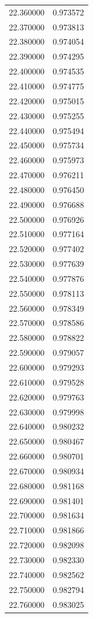 \begin{tabular}{rr}
22.360000 & 0.973572 \\
22.370000 & 0.973813 \\
22.380000 & 0.974054 \\
22.390000 & 0.974295 \\
22.400000 & 0.974535 \\
22.410000 & 0.974775 \\
22.420000 & 0.975015 \\
22.430000 & 0.975255 \\
22.440000 & 0.975494 \\
22.450000 & 0.975734 \\
22.460000 & 0.975973 \\
22.470000 & 0.976211 \\
22.480000 & 0.976450 \\
22.490000 & 0.976688 \\
22.500000 & 0.976926 \\
22.510000 & 0.977164 \\
22.520000 & 0.977402 \\
22.530000 & 0.977639 \\
22.540000 & 0.977876 \\
22.550000 & 0.978113 \\
22.560000 & 0.978349 \\
22.570000 & 0.978586 \\
22.580000 & 0.978822 \\
22.590000 & 0.979057 \\
22.600000 & 0.979293 \\
22.610000 & 0.979528 \\
22.620000 & 0.979763 \\
22.630000 & 0.979998 \\
22.640000 & 0.980232 \\
22.650000 & 0.980467 \\
22.660000 & 0.980701 \\
22.670000 & 0.980934 \\
22.680000 & 0.981168 \\
22.690000 & 0.981401 \\
22.700000 & 0.981634 \\
22.710000 & 0.981866 \\
22.720000 & 0.982098 \\
22.730000 & 0.982330 \\
22.740000 & 0.982562 \\
22.750000 & 0.982794 \\
22.760000 & 0.983025 \\

\end{tabular}
